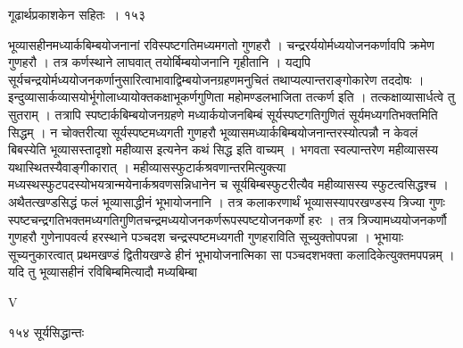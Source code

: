 \documentclass[11pt, openany]{book}
\begin{document}
 \hspace{3cm} गूढार्थप्रकाशकेन सहितः~। \hfill १५३
\vspace{1cm}

\begin{sloppypar}
\noindent भूव्यासहीनमध्यार्कबिम्बयोजनानां रविस्पष्टगतिमध्यमगतो गुणहरौ । चन्द्ररर्ययोर्मध्ययोजनकर्णावपि क्रमेण गुणहरौ । तत्र कर्णस्थाने लाघवात् तयोर्बिम्बयोजनानि गृहीतानि । यद्यपि सूर्यचन्द्रयोर्मध्ययोजनकर्णानुसारित्वाभावाद्विम्बयोजनग्रहणमनुचितं तथाप्यल्पान्तराङ्गोकारेण तददोषः । इन्दुव्यासार्कव्यासयोर्भूगोलाध्यायोक्तकक्षाभूकर्णगुणिता महोमण्डलभाजिता तत्कर्ण इति । तत्कक्षाव्यासार्धत्वे तु सुतराम् । तत्रापि स्पष्टार्कबिम्बयोजनग्रहणे मध्यार्कयोजनबिम्बं सूर्यस्पष्टगतिगुणितं सूर्यमध्यगतिभक्तमिति सिद्धम् । न चोक्तरीत्या सूर्यस्पष्टमध्यगती गुणहरौ भूव्यासमध्यार्कबिम्बयोजनान्तरस्योत्पन्नौ न केवलं बिबस्येति भूव्यासस्तादृशो महीव्यास इत्यनेन कथं सिद्ध इति वाच्यम् । भगवता स्वल्पान्तरेण महीव्यासस्य यथास्थितस्यैवाङ्गीकारात् । महीव्यासस्फुटार्कश्रवणान्तरमित्युक्त्या मध्यस्थस्फुटपदस्योभयत्रान्मयेनार्कश्रवणसन्निधानेन च सूर्यबिम्बस्फुटरीत्यैव महीव्यासस्य स्फुटत्वसिद्धश्च । अथैतत्खण्डसिद्धं फलं भूव्यासाद्धीनं भूभायोजनानि । तत्र कलाकरणार्थं भूव्यासस्यापरखण्डस्य त्रिज्या गुणः स्पष्टचन्द्रगतिभक्तमध्यगतिगुणितचन्द्रमध्ययोजनकर्णरूपस्पष्टयोजनकर्णो हरः । तत्र त्रिज्यामध्ययोजनकर्णौ गुणहरौ गुणेनापवर्त्य हरस्थाने पञ्चदश चन्द्रस्पष्टमध्यगती गुणहराविति सूच्युक्तोपपन्ना । भूभायाः सूच्यनुकारत्वात् प्रथमखण्डं द्वितीयखण्डे हीनं भूभायोजनात्मिका सा पञ्चदशभक्ता कलादिकेत्युक्तमपपन्नम् । यदि तु भूव्यासहीनं रविबिम्बमित्यादौ मध्यबिम्बा\textendash
\end{sloppypar}

{\tiny{V}}


\newpage



\noindent  १५४ \hspace{4cm} सूर्यसिद्धान्तः 
\vspace{1cm}
\end{document}
